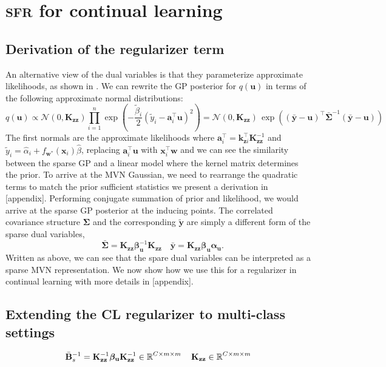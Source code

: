 \documentclass{article}
\newcommand{\our}{\textsc{sfr}\xspace}
\newcommand{\mathbold}[1]{\bm{#1}}
\newcommand{\mbf}[1]{\mathbf{#1}}
\newcommand{\MB}{\mbf{B}}
\newcommand{\valpha}[0]{\mathbold{\alpha}}
\newcommand{\vbeta}[0]{\mathbold{\beta}}
\newcommand{\vu}{\mbf{u}}
\newcommand{\vx}{\mbf{x}}
\newcommand{\vy}{\mbf{y}}
\newcommand{\vw}{\mbf{w}}
\newcommand{\va}{\mbf{a}}
\newcommand{\MKzz}{\mbf{K}_{\mbf{z}\mbf{z}}}
\newcommand{\vkzi}{\mbf{k}_{\mbf{z}i}}
\newcommand{\MSigma}[0]{\mathbold{\Sigma}}
\newcommand{\Norm}{\mathcal{N}}
\begin{document}
\section{\our for continual learning}
\label{app:cl}
\subsection{Derivation of the regularizer term}
An alternative view of the dual variables is that they parameterize approximate likelihoods, as shown in \citep{adam2021dual, khan2017conjugate}. We can rewrite the GP posterior for $q(\vu)$ in terms of the following approximate normal distributions:
\begin{equation}
 q(\vu) \propto \Norm(0, \MKzz) \prod_{i=1}^n \exp \! \left(-\frac{\tilde{\beta}_i}{2}(\tilde{y}_i - \va_i^\top \vu)^2 \right) = \Norm(0, \MKzz) \, \exp\left((\bar{\vy} - \vu)^\top \bar{\MSigma}^{-1}(\bar{\vy} - \vu)\right)  
\end{equation}
The first normals are the approximate likelihoods where $\va_i^\top = \vkzi^\top \MKzz^{-1}$ and $\tilde{y}_i = \hat{\alpha}_i + f_{\vw^*}(\vx_i)\hat{\beta}$,  replacing $\va_i^\top \vu$ with $\vx_i^{\top}\vw$ and we can see the similarity between the sparse GP and a linear model where the kernel matrix determines the prior. To arrive at the MVN Gaussian, we need to rearrange the quadratic terms to match the prior sufficient statistics we present a derivation in [appendix]. Performing conjugate summation of prior and likelihood, we would arrive at the sparse GP posterior at the inducing points. The correlated covariance structure $\MSigma$ and the corresponding $\tilde{\vy}$ are simply a different form of the sparse dual variables,
\begin{equation}
\quad \bar{\MSigma} =  \MKzz \vbeta_\vu^{-1} \MKzz \quad \bar{\vy} = \MKzz \vbeta_{\vu}\valpha_{\vu}.
\end{equation}
Written as above, we can see that the spare dual variables can be interpreted as a sparse MVN representation. We now show how we use this for a regularizer in continual learning with more details in [appendix].

\subsection{Extending the CL regularizer to multi-class settings}
\begin{equation}
	\bar{\MB}^{-1}_s = \MKzz^{-1} \vbeta_\vu \MKzz^{-1} \in \R^{C \times m \times m} \quad \MKzz \in \R^{C \times m \times m} 
\end{equation}
\end{document}
